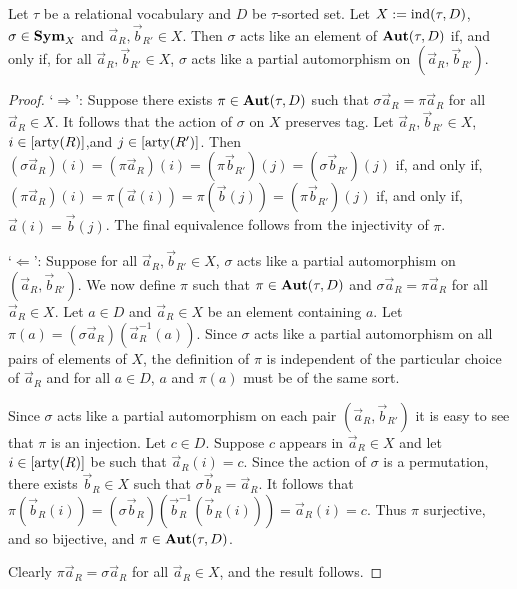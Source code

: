 \documentclass[../paper.tex]{subfiles}
\begin{document}
\begin{lem}
  Let $\tau$ be a relational vocabulary and $D$ be $\tau$-sorted set. Let $X :=
  \text{\upshape ind}(\tau, D)$, $\sigma \in \text{\textbf{Sym}}_X$ and $\vec{a}_R, \vec{b}_{R'} \in X$. Then
  $\sigma$ acts like an element of $\text{\textbf{Aut}} (\tau, D)$ if, and only if, for all
  $\vec{a}_R, \vec{b}_{R'} \in X$, $\sigma$ acts like a partial automorphism on
  $(\vec{a}_R, \vec{b}_{R'})$.
  \label{lem:aut-partial}
\end{lem}
\begin{proof}
  `$\Rightarrow$': Suppose there exists $\pi \in \text{\textbf{Aut}}(\tau, D)$ such that
  $\sigma \vec{a}_R = \pi \vec{a}_R$ for all $\vec{a}_R \in X$. It follows that
  the action of $\sigma$ on $X$ preserves tag. Let $\vec{a}_R, \vec{b}_{R'} \in
  X$, $i \in [\mathrm{arty} (R)]$,and $j \in [\mathrm{arty} (R')]$. Then $(\sigma \vec{a}_R) (i)
  = (\pi \vec{a}_R)(i) = (\pi \vec{b}_{R'})(j) = (\sigma \vec{b}_{R'})(j)$ if,
  and only if, $(\pi \vec{a}_R)(i) = \pi (\vec{a}(i)) = \pi (\vec{b}(j)) =
  (\pi\vec{b}_{R'})(j)$ if, and only if, $\vec{a}(i) = \vec{b}(j)$. The final
  equivalence follows from the injectivity of $\pi$.
  
  `$\Leftarrow$': Suppose for all $\vec{a}_R, \vec{b}_{R'} \in X$, $\sigma$ acts
  like a partial automorphism on $(\vec{a}_R, \vec{b}_{R'})$. We now define
  $\pi$ such that $\pi \in \text{\textbf{Aut}}(\tau, D)$ and $\sigma \vec{a}_R = \pi \vec{a}_R$
  for all $\vec{a}_R \in X$. Let $a \in D$ and $\vec{a}_R \in X$ be an element
  containing $a$. Let $\pi (a) = (\sigma \vec{a}_R) (\vec{a}^{-1}_R(a))$. Since
  $\sigma$ acts like a partial automorphism on all pairs of elements of $X$, the
  definition of $\pi$ is independent of the particular choice of $\vec{a}_R$ and
  for all $a \in D$, $a$ and $\pi (a)$ must be of the same sort.
  
  Since $\sigma$ acts like a partial automorphism on each pair $(\vec{a}_R,
  \vec{b}_{R'})$ it is easy to see that $\pi$ is an injection. Let $c \in D$.
  Suppose $c$ appears in $\vec{a}_R \in X$ and let $i \in [\mathrm{arty}(R)]$ be such
  that $\vec{a}_R(i) = c$. Since the action of $\sigma$ is a permutation, there
  exists $\vec{b}_R \in X$ such that $\sigma \vec{b}_R = \vec{a}_R$. It follows
  that $\pi (\vec{b}_R(i)) = (\sigma \vec{b}_R) (\vec{b}^{-1}_R(\vec{b}_R(i))) =
  \vec{a}_R(i) = c$. Thus $\pi$ surjective, and so bijective, and $\pi \in
  \text{\textbf{Aut}}(\tau, D)$.

  Clearly $\pi \vec{a}_R = \sigma \vec{a}_R$ for all $\vec{a}_R \in X$, and the
  result follows.

\end{proof}
\end{document}
